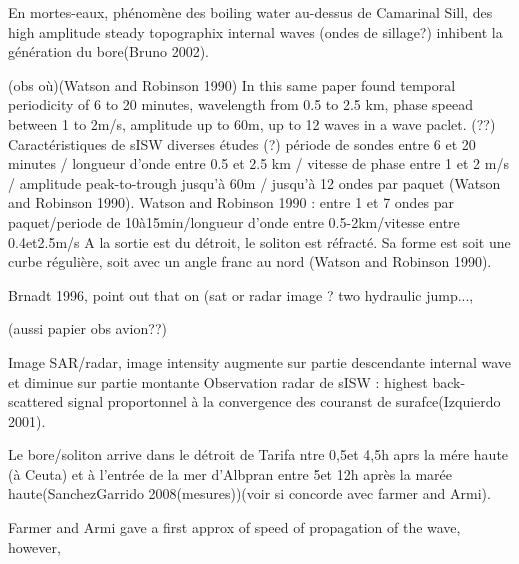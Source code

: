 En mortes-eaux, phénomène des boiling water au-dessus de Camarinal Sill, des high amplitude steady topographix internal waves (ondes de sillage?) inhibent la génération du bore(Bruno 2002).

(obs où)(Watson and Robinson 1990) In this same paper found temporal periodicity of 6 to 20 minutes, wavelength from 0.5 to 2.5 km, phase speead between 1 to 2m/s, amplitude up to 60m, up to 12 waves in a wave paclet. (??)
Caractéristiques de sISW diverses études (?) période de sondes entre 6 et 20 minutes / longueur d'onde entre 0.5 et 2.5 km / vitesse de phase entre 1 et 2 m/s / amplitude peak-to-trough jusqu'à 60m / jusqu'à 12 ondes par paquet (Watson and Robinson 1990). Watson and Robinson 1990 : entre 1 et 7 ondes par paquet/periode de 10à15min/longueur d'onde entre 0.5-2km/vitesse entre 0.4et2.5m/s
A la sortie est du détroit, le soliton est réfracté. Sa forme est soit une curbe régulière, soit avec un angle franc au nord (Watson and Robinson 1990).


Brnadt 1996, point out that on (sat or radar image ? two hydraulic jump..., 


(aussi papier obs avion??)



Image SAR/radar, image intensity augmente sur partie descendante internal wave et diminue sur partie montante
Observation radar de sISW : highest back-scattered signal proportonnel à la convergence des couranst de surafce(Izquierdo 2001).

Le bore/soliton arrive dans le détroit de Tarifa ntre 0,5et 4,5h aprs la mére haute (à Ceuta) et à l’entrée de la mer d’Albpran entre 5et 12h après la marée haute(SanchezGarrido 2008(mesures))(voir si concorde avec farmer and Armi).

Farmer and Armi gave a first approx of speed of propagation of the wave, however, 


